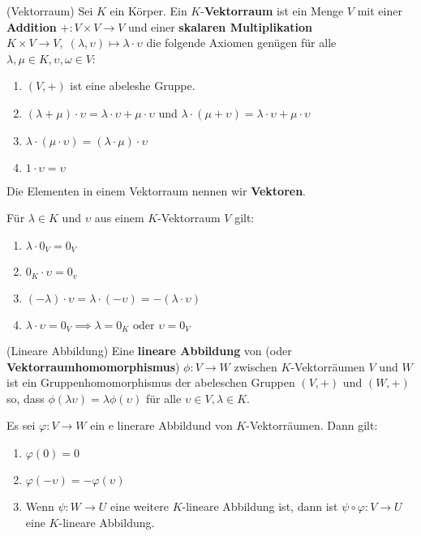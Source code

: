 \documentclass[../Algebra_script.tex]{subfiles}
\begin{document}
\begin{definition}{(Vektorraum)}
	Sei $K$ ein Körper. Ein $K$-\textbf{Vektorraum} ist ein Menge $V$ mit einer \textbf{Addition} $+: V \times V \to V$ und einer \textbf{skalaren Multiplikation} $K \times V \to V, \; (\lambda, \upsilon) \mapsto \lambda \cdot \upsilon$ die folgende Axiomen genügen für alle $\lambda, \mu \in K, \upsilon, \omega \in V$: 
	\begin{enumerate}
		\item $(V, +)$ ist eine abeleshe Gruppe.
		\item $(\lambda + \mu) \cdot \upsilon = \lambda \cdot \upsilon + \mu \cdot \upsilon$ und $\lambda \cdot (\mu + \upsilon) = \lambda \cdot \upsilon + \mu \cdot \upsilon$ 
		\item $\lambda \cdot (\mu \cdot \upsilon) = (\lambda \cdot \mu) \cdot \upsilon$
		\item $1 \cdot \upsilon = \upsilon$
	\end{enumerate}	
	Die Elementen in einem Vektorraum nennen wir \textbf{Vektoren}.
\end{definition}

\begin{proposition}
	Für $\lambda \in K$ und $\upsilon$ aus einem $K$-Vektorraum $V$ gilt:
	\begin{enumerate}
		\item $\lambda \cdot 0_V = 0_V$
		\item $0_K \cdot \upsilon = 0_v$
		\item $(-\lambda) \cdot \upsilon = \lambda \cdot (-\upsilon) = -(\lambda \cdot \upsilon)$
		\item $\lambda \cdot \upsilon = 0_V \implies \lambda = 0_K \text{ oder } \upsilon = 0_V$
	\end{enumerate}
\end{proposition}

\begin{definition}{(Lineare Abbildung)}
	Eine \textbf{lineare Abbildung} von (oder \textbf{Vektorraumhomomorphismus}) $\phi : V \to W$ zwischen $K$-Vektorräumen $V$ und $W$ ist ein Gruppenhomomorphismus der abeleschen Gruppen $(V, +)$ und $(W, +)$ so, dass $\phi(\lambda\upsilon) = \lambda\phi(\upsilon)$ für alle $\upsilon \in V, \lambda \in K$.
\end{definition}


\begin{proposition}
	Es sei $\varphi: V \to W$ ein e linerare Abbildund von $K$-Vektorräumen. Dann gilt:
	\begin{enumerate}
		\item $\varphi(0) = 0$
		\item $\varphi(-\upsilon) = -\varphi(\upsilon)$
		\item Wenn $\psi: W \to U$ eine weitere $K$-lineare Abbildung ist, dann ist $\psi \circ \varphi: V \to U$ eine $K$-lineare Abbildung. 
	\end{enumerate}
\end{proposition}
\end{document}

